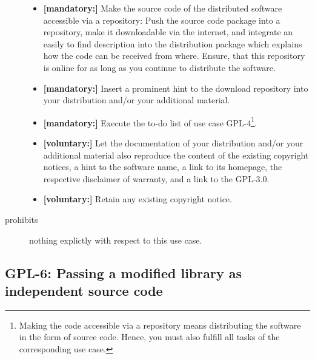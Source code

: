 \begin{description}
\begin{itemize}
  \item \textbf{[mandatory:]} Make the source code of the distributed software
  accessible via a repository: Push the source code package into a repository,
  make it downloadable via the internet, and integrate an easily to find
  description into the distribution package which explains how the code can be
  received from where. Ensure, that this repository is online for as long as you
  continue to distribute the software.
  
  \item \textbf{[mandatory:]} Insert a prominent hint to the download repository
  into your distribution and/or your additional material.
  
  \item \textbf{[mandatory:]} Execute the to-do list of use case GPL-4\footnote{
  Making the code accessible via a repository means distributing the software in
  the form of source code. Hence, you must also fulfill all tasks of the
  corresponding use case.}.
    
  \item \textbf{[voluntary:]} Let the documentation of your distribution and/or
  your additional material also reproduce the content of the existing
  copyright notices, a hint to the software name, a link to its homepage,
  the respective disclaimer of warranty, and a link to the GPL-3.0.
  
  \item \textbf{[voluntary:]} Retain any existing copyright notice. 


\end{itemize}

\item[prohibits] nothing explictly with respect to this use case.

\end{description}

\subsection{GPL-6: Passing a modified library as independent source code}
\label{OSUC-08-GPL}

